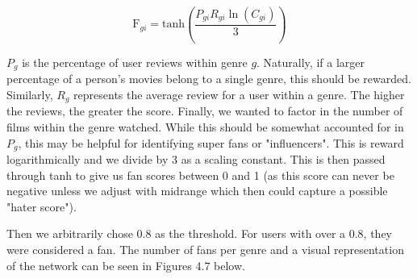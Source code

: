 \documentclass[12pt]{article}
\numberwithin{equation}{section}
\begin{document}
\[
\text{F}_{gi}= \text{tanh}\left(\frac{P_{gi} R_{gi}\ln(C_{gi})}{3}\right)
\]

$P_g$ is the percentage of user reviews within genre $g$. Naturally, if a larger percentage of a person's movies belong to a single genre, this should be rewarded. Similarly, $R_g$ represents the average review for a user within a genre. The higher the reviews, the greater the score. Finally, we wanted to factor in the number of films within the genre watched. While this should be somewhat accounted for in $P_g$, this may be helpful for identifying super fans or "influencers". This is reward logarithmically and we divide by 3 as a scaling constant.
This is then passed through tanh to give us fan scores between 0 and 1 (as this score can never be negative unless we adjust with midrange which then could capture a possible "hater score").

Then we arbitrarily chose 0.8 as the threshold. For users with over a 0.8, they were considered a fan.  The number of fans per genre and a visual representation of the network can be seen in Figures 4.7  below.
\end{document}
